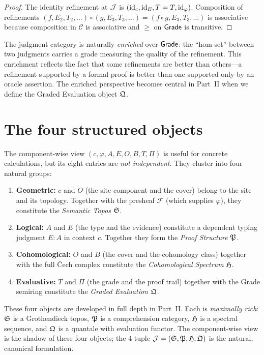 \begin{proof}
The identity refinement at $\mathcal{J}$ is $(\mathrm{id}_c, \mathrm{id}_E, T = T, \mathrm{id}_\varphi)$.
Composition of refinements $(f, E_2, T_2, \ldots) \circ (g, E_3, T_3, \ldots)
= (f \circ g, E_3, T_3, \ldots)$ is associative because composition in
$\mathcal{C}$ is associative and $\geq$ on $\mathsf{Grade}$ is transitive.
\end{proof}

\begin{remark}[Enrichment]
\label{rem:enrichment}
The judgment category is naturally \emph{enriched} over $\mathsf{Grade}$: the
``hom-set'' between two judgments carries a grade measuring the
quality of the refinement.  This enrichment reflects the fact that some
refinements are better than others---a refinement supported by a formal
proof is better than one supported only by an oracle assertion.
The enriched perspective becomes central in Part~II when we define
the Graded Evaluation object $\mathfrak{Q}$.
\end{remark}


\section{The four structured objects}
\label{sec:judgment:structured}

\begin{remark}
\label{rem:components-to-structure}
The component-wise view $(c, \varphi, A, E, O, B, T, \Pi)$
is useful for concrete calculations, but its eight entries are
\emph{not independent}.  They cluster into four natural groups:

\begin{enumerate}
\item \textbf{Geometric:} $c$ and $O$ (the site component and the
  cover) belong to the site and its topology.  Together with the
  presheaf $\mathcal{F}$ (which supplies $\varphi$), they constitute the
  \emph{Semantic Topos} $\mathfrak{S}$.

\item \textbf{Logical:} $A$ and $E$ (the type and the evidence)
  constitute a dependent typing judgment $E : A$ in context $c$.
  Together they form the \emph{Proof Structure} $\mathfrak{P}$.

\item \textbf{Cohomological:} $O$ and $B$ (the cover and the
  cohomology class) together with the full \v{C}ech complex
  constitute the \emph{Cohomological Spectrum} $\mathfrak{H}$.

\item \textbf{Evaluative:} $T$ and $\Pi$ (the grade and the proof
  trail) together with the Grade semiring constitute the
  \emph{Graded Evaluation} $\mathfrak{Q}$.
\end{enumerate}

These four objects are developed in full depth in Part~II.  Each is
\emph{maximally rich}: $\mathfrak{S}$ is a Grothendieck topos, $\mathfrak{P}$
is a comprehension category, $\mathfrak{H}$ is a spectral sequence, and
$\mathfrak{Q}$ is a quantale with evaluation functor.  The component-wise
view is the shadow of these four objects; the 4-tuple
$\mathcal{J} = (\mathfrak{S}, \mathfrak{P}, \mathfrak{H}, \mathfrak{Q})$ is the natural, canonical
formulation.
\end{remark}

